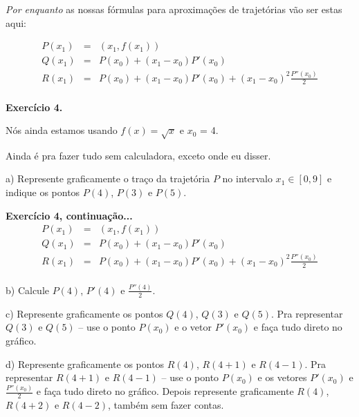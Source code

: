 \documentclass[oneside,12pt]{article}
\begin{document}
\newpage


{\sl Por enquanto} as nossas fórmulas para aproximações de trajetórias
vão ser estas aqui:

$$\begin{array}{rcl}
  P(x_1) &=& (x_1,f(x_1)) \\
  Q(x_1) &=& P(x_0) + (x_1-x_0)P'(x_0) \\
  R(x_1) &=& P(x_0) + (x_1-x_0)P'(x_0) + (x_1-x_0)^2\frac{P''(x_0)}{2} \\
  \end{array}
$$

\bsk

{\bf Exercício 4.}

Nós ainda estamos usando $f(x) = \sqrt{x}$ e $x_0$ = 4.

Ainda é pra fazer tudo sem calculadora, exceto onde eu disser.

a) Represente graficamente o traço da trajetória $P$ no intervalo
$x_1∈[0,9]$ e indique os pontos $P(4)$, $P(3)$ e $P(5)$.

\newpage

{\bf Exercício 4, continuação...}
%
$$\begin{array}{rcl}
  P(x_1) &=& (x_1,f(x_1)) \\
  Q(x_1) &=& P(x_0) + (x_1-x_0)P'(x_0) \\
  R(x_1) &=& P(x_0) + (x_1-x_0)P'(x_0) + (x_1-x_0)^2\frac{P''(x_0)}{2} \\
  \end{array}
$$

b) Calcule $P(4)$, $P'(4)$ e $\frac{P''(4)}{2}$.

c) Represente graficamente os pontos $Q(4)$, $Q(3)$ e $Q(5)$. Pra
representar $Q(3)$ e $Q(5)$ 
-- use o ponto $P(x_0)$ e o vetor $P'(x_0)$ e faça tudo direto no
gráfico.

d) Represente graficamente os pontos $R(4)$, $R(4+1)$ e $R(4-1)$. Pra
representar $R(4+1)$ e $R(4-1)$  -- use o ponto $P(x_0)$ e os vetores $P'(x_0)$ e
$\frac{P''(x_0)}{2}$ e faça tudo direto no gráfico. Depois represente
graficamente $R(4)$, $R(4+2)$ e $R(4-2)$, também sem fazer contas.

\newpage

\end{document}
